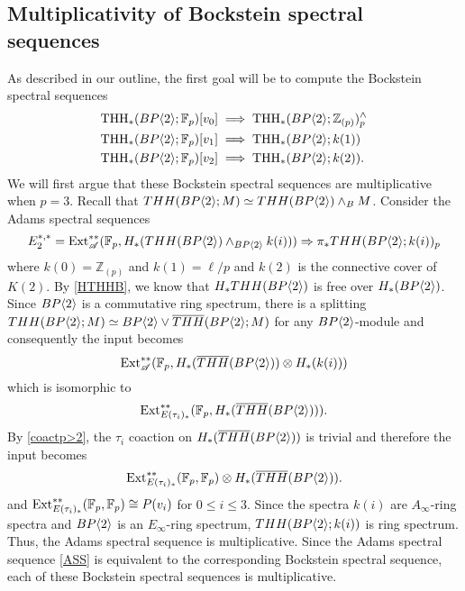 \subsection{Multiplicativity of Bockstein spectral sequences}
As described in our outline, the first goal will be to compute the Bockstein spectral sequences
\begin{align}
	\label{v_0BSS}\operatorname{THH}_*(BP\langle 2 \rangle;\mathbb{F}_p)[v_0]&\implies \operatorname{THH}_*(BP\langle 2 \rangle;\mathbb{Z}_{(p)})^{\wedge}_p\\
	\label{v_1BSS}\operatorname{THH}_*(BP\langle 2 \rangle;\mathbb{F}_p)[v_1]&\implies \operatorname{THH}_*(BP\langle 2 \rangle;k(1))\\
	\label{v_2BSS}\operatorname{THH}_*(BP\langle 2 \rangle;\mathbb{F}_p)[v_2]&\implies \operatorname{THH}_*(BP\langle 2 \rangle;k(2)).
\end{align}
We will first argue that these Bockstein spectral sequences are multiplicative when $p=3$. Recall that $THH(BP\langle 2 \rangle;M)\simeq THH(BP\langle 2 \rangle)\wedge_BM$. 
Consider the Adams spectral sequences
\begin{equation}\label{ASS} E_2^{*,*}=\operatorname{Ext}_{\mathscr{A}}^{**}(\mathbb{F}_p, H_*(THH(BP\langle 2 \rangle)\wedge_{BP\langle 2 \rangle}k(i)))\Rightarrow \pi_*THH(BP\langle 2 \rangle;k(i))_p \end{equation}
where $k(0)=\mathbb{Z}_{(p)}$ and $k(1)=\ell/p$ and $k(2)$ is the connective cover of $K(2)$. 
By \eqref{HTHHB}, we know that $H_*THH(BP\langle 2 \rangle)$ is free over $H_*(BP\langle 2 \rangle)$. Since $BP\langle 2 \rangle$ is a commutative ring spectrum, there is a splitting $THH(BP\langle 2 \rangle;M)\simeq BP\langle 2 \rangle\vee \overline{THH}(BP\langle 2 \rangle;M)$ for any $BP\langle 2 \rangle$-module and consequently the input becomes 
\[\operatorname{Ext}_{\mathscr{A}}^{**}(\mathbb{F}_p, H_*(\overline{THH}(BP\langle 2 \rangle))\otimes H_*(k(i)))\]
which is isomorphic to 
\[\operatorname{Ext}_{E(\tau_i)_*}^{**}(\mathbb{F}_p, H_*(\overline{THH}(BP\langle 2 \rangle))).\]
By \eqref{coactp>2}, the $\tau_i$ coaction on $H_*(\overline{THH}(BP\langle 2 \rangle))$ is trivial and therefore the input becomes 
\[\operatorname{Ext}_{E(\tau_i)_*}^{**}(\mathbb{F}_p,\mathbb{F}_p )\otimes H_*(\overline{THH}(BP\langle 2 \rangle)).\]
and $\operatorname{Ext}_{E(\tau_i)_*}^{**}(\mathbb{F}_p,\mathbb{F}_p )\cong P(v_i)$ for $0\le i\le 3$. Since the spectra $k(i)$ are $A_{\infty}$-ring spectra  and $BP\langle 2 \rangle$ is an $E_{\infty}$-ring spectrum, $THH(BP\langle 2 \rangle;k(i))$ is ring spectrum. Thus, the Adams spectral sequence is multiplicative. Since the Adams spectral sequence \eqref{ASS} is equivalent to the corresponding Bockstein spectral sequence, each of these Bockstein spectral sequences is multiplicative. 

